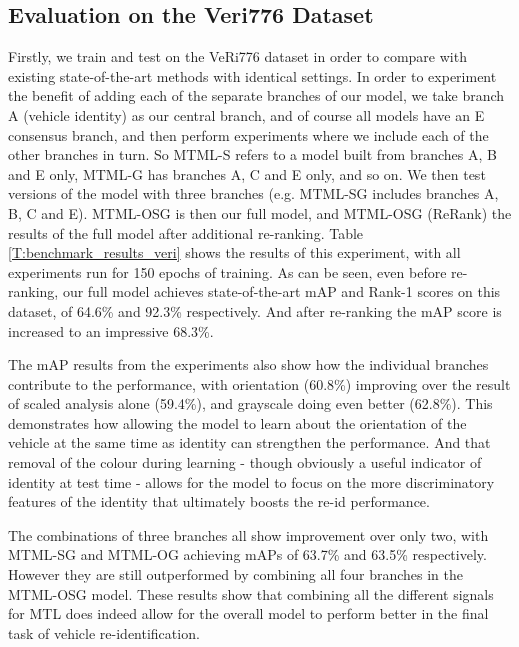 \documentclass[10pt,twocolumn,letterpaper]{article}
\begin{document}
\subsection{Evaluation on the Veri776 Dataset}
Firstly, we train and test on the VeRi776 dataset in order to compare with
existing state-of-the-art methods with identical settings. In order to experiment the benefit of adding each of the separate branches of our model, we take branch A (vehicle identity) as our central branch, and of course all models have an E consensus branch, and then perform experiments where we include each of the other branches in turn. So MTML-S refers to a model built from branches A, B and E only, MTML-G has branches A, C and E only, and so on. We then test versions of the model with three branches (e.g. MTML-SG includes branches A, B, C and E).  MTML-OSG is then our full model, and MTML-OSG (ReRank) the results of the full model after additional re-ranking. Table \ref{T:benchmark_results_veri} shows the results of this
experiment, with all experiments run for 150 epochs of training. As can be seen,
even before re-ranking, our full model achieves state-of-the-art mAP
and Rank-1 scores on this dataset, of 64.6\% and 92.3\%
respectively. And after re-ranking the mAP score is increased to an
impressive 68.3\%.

The mAP results from the experiments also show how the individual branches contribute to the performance, with orientation (60.8\%) improving over the result of scaled analysis alone (59.4\%), and grayscale doing even better (62.8\%). This demonstrates how allowing the model to learn about the orientation of the vehicle at the same time as identity can strengthen the performance. And that removal of the colour during learning - though obviously a useful indicator of identity at test time - allows for the model to focus on the more discriminatory features of the identity that ultimately boosts the re-id performance.

The combinations of three branches all show improvement over only two, with MTML-SG and MTML-OG achieving mAPs of 63.7\% and 63.5\% respectively. However they are still outperformed by combining all four branches in the MTML-OSG model. These results show that combining all the different signals for MTL does indeed allow for the overall model to perform better in the final task of vehicle re-identification.


\end{document}
